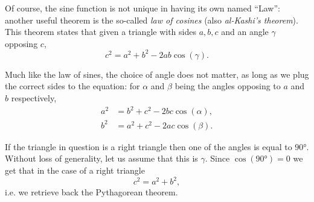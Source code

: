 Of course, the sine function is not unique in having its own named ``Law'': another useful theorem is the so-called \emph{law of cosines} (also \emph{al-Kashi's theorem}). This theorem states that given a triangle with sides $a,b,c$ and an angle $\gamma$ opposing $c$,
\begin{equation}
	c^{2} = a^{2} + b^{2} - 2ab\cos(\gamma).
	\label{eq:law of cosines}
\end{equation}

Much like the law of sines, the choice of angle does not matter, as long as we plug the correct sides to the equation: for $\alpha$ and $\beta$ being the angles opposing to $a$ and $b$ respectively,
\begin{align}
	a^{2} &= b^{2} + c^{2} - 2bc\cos(\alpha),\nonumber\\
	b^{2} &= a^{2} + c^{2} - 2ac\cos(\beta).
\end{align}

If the triangle in question is a right triangle then one of the angles is equal to $\ang{90}$. Without loss of generality, let us assume that this is $\gamma$. Since $\cos(\ang{90})=0$ we get that in the case of a right triangle
\begin{equation}
	c^{2} = a^{2} + b^{2},
	\label{eq:pythagorean theorem from law of cosines}
\end{equation}
i.e. we retrieve back the Pythagorean theorem.

